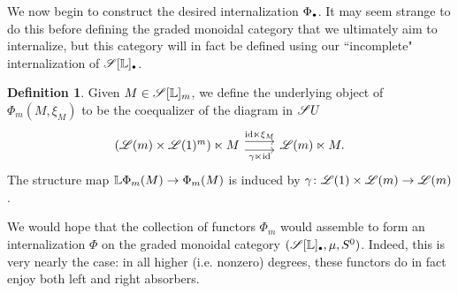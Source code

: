 \documentclass[openany, amssymb, psamsfonts]{amsart}
\theoremstyle{definition}
\newtheorem{defn}{Definition}[section]
\numberwithin{equation}{section}
\begin{document}
We now begin to construct the desired internalization $\Phi_\sbull$. It may seem strange to do this before defining the graded monoidal category that we ultimately aim to internalize, but this category will in fact be defined using our ``incomplete" internalization of $\scS[\LL]_\sbull$.

\begin{defn}
    Given $M \in \mathscr{S}[\mathbb{L}]_m$, we define the underlying object of $\Phi_m(M, \xi_M)$ to be the coequalizer of the diagram in $\mathscr{S} U$
    \begin{equation*}
        \begin{tikzcd}
            (\scL(m) \times \scL(1)^m) \ltimes M \ar[r, shift right = 0.35em, "\gamma \ltimes \id"'] \ar[r, shift left = 0.35em, "\id \ltimes \xi_M"] & \scL(m) \ltimes M.
        \end{tikzcd}
    \end{equation*} The structure map $\mathbb{L} \Phi_m(M) \to \Phi_m(M)$ is induced by $\gamma \colon \mathscr{L}(1) \times \mathscr{L}(m) \to \mathscr{L}(m)$. 
\end{defn}

We would hope that the collection of functors $\Phi_m$ would assemble to form an internalization $\Phi$ on the graded monoidal category $(\scS[\LL]_\sbull, \mu, S^0)$. Indeed, this is very nearly the case: in all higher (i.e. nonzero) degrees, these functors do in fact enjoy both left and right absorbers.
\end{document}
